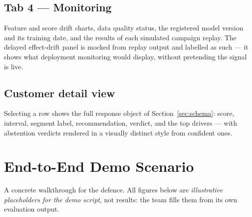 \documentclass[11pt,a4paper]{article}
\begin{document}
\subsection{Tab 4 --- Monitoring}

Feature and score drift charts, data quality status, the registered model version and its training
date, and the results of each simulated campaign replay. The delayed effect-drift panel is mocked
from replay output and labelled as such --- it shows what deployment monitoring would display,
without pretending the signal is live.

\subsection{Customer detail view}

Selecting a row shows the full response object of Section~\ref{sec:schema}: score, interval,
segment label, recommendation, verdict, and the top drivers --- with abstention verdicts rendered
in a visually distinct style from confident ones.

\section{End-to-End Demo Scenario}

A concrete walkthrough for the defence. All figures below are \emph{illustrative placeholders for
the demo script}, not results: the team fills them from its own evaluation output.
\end{document}
